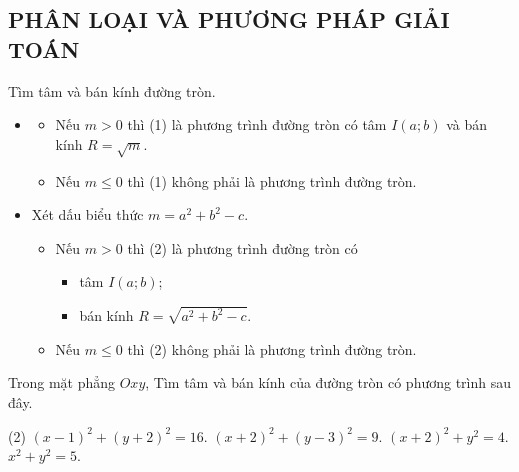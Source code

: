 \subsection{PHÂN LOẠI VÀ PHƯƠNG PHÁP GIẢI TOÁN}
\begin{dang}{Tìm tâm và bán kính đường tròn.}
	\begin{itemize}
		\item [\iconMT] 
		\begin{itemize}
			\item [\ding{172}] Nếu $m > 0$ thì (1) là phương trình đường tròn có tâm $I\left(a;b\right)$ và bán kính $R=\sqrt{m}$.
			\item [\ding{173}] Nếu $m\le 0$ thì (1) không phải là phương trình đường tròn.
		\end{itemize}
		\item [\iconMT]  Xét dấu biểu thức $m=a^2+b^2-c$.
		\begin{itemize}
			\item [\ding{172}] Nếu $m > 0$ thì (2) là phương trình đường tròn có
			\begin{itemize}
				\item  tâm $I\left(a;b\right)$;
				\item  bán kính $R=\sqrt{a^2+b^2-c}$.
			\end{itemize}
			\item [\ding{173}] Nếu $m\le 0$ thì (2) không phải là phương trình đường tròn.
		\end{itemize}
	\end{itemize}
\end{dang}

\begin{vd}
	Trong mặt phẳng $Oxy$, Tìm tâm và bán kính của đường tròn có phương trình sau đây.
	\begin{tasks}(2)
		\task $(x-1)^2+(y+2)^2=16$.
		\task $(x+2)^2+(y-3)^2=9$.
		\task $(x+2)^2+y^2=4$.
		\task $x^2+y^2=5$.
	\end{tasks}
	\loigiai{
		
	}
\end{vd}

